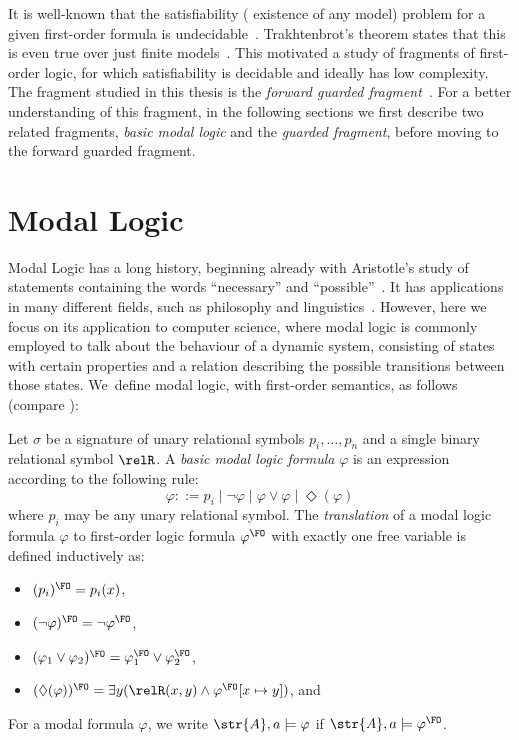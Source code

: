 It is well-known that the satisfiability (\ie{} existence of any model) problem for a given first-order formula is undecidable~\cite[Sec. 1.1]{borger1997}.
Trakhtenbrot's theorem states that this is even true over just finite models~\cite{trakhtenbrot50}.
This motivated a study of fragments of first-order logic, for which satisfiability is decidable and ideally has low complexity.
The fragment studied in this thesis is the \emph{forward guarded fragment}~\cite[Sec. 3.1]{Bednarczyk21}.
For a better understanding of this fragment, in the following sections we first describe two related fragments, \emph{basic modal logic} and the \emph{guarded fragment}, before moving to the forward guarded fragment.

\section{Modal Logic}
Modal Logic has a long history, beginning already with Aristotle's study of statements containing the words ``necessary'' and ``possible''~\cite{goldblatt2006}.
It has applications in many different fields, such as philosophy and linguistics~\cite{vanBenthem2010-VANMLF-4}.
However, here we focus on its application to computer science, where modal logic is commonly employed to talk about the behaviour of a dynamic system, consisting of states with certain properties and a relation describing the possible transitions between those states.
We~define modal logic, with first-order semantics, as follows (compare \cite[Sec. 2.1.2]{otto2004a}):
\begin{definition}
  Let $\sigma$ be a signature of unary relational symbols $p_{i}, \ldots, p_{n}$ and a single binary relational symbol $\relR$.
  A \emph{basic modal logic formula} $\varphi$ is an expression according to the following rule:
  \begin{equation*}
    \varphi ::= p_{i}
      \mid \neg \varphi
      \mid \varphi \lor \varphi
      \mid \Diamond(\varphi)
  \end{equation*}
  where $p_{i}$ may be any unary relational symbol.
  The \emph{translation} of a modal logic formula $\varphi$ to first-order logic formula $\varphi^{\FO}$ with exactly one free variable is defined inductively as:
  \begin{itemize}
    \item $(p_{i})^{\FO} = p_{i}(x)$,
    \item $(\neg \varphi)^{\FO} = \neg \varphi^{\FO}$,
    \item $(\varphi_{1} \lor \varphi_{2})^{\FO} = \varphi_{1}^{\FO} \lor \varphi_{2}^{\FO}$,
    \item $(\Diamond (\varphi))^{\FO} = \exists{y}(\relR(x,y) \land \varphi^{\FO}[x \mapsto y])$, and
  \end{itemize}
  For a modal formula $\varphi$, we write $\str{A}, a \models \varphi$ if $\str{A}, a \models \varphi^{\FO}$.
\end{definition}
